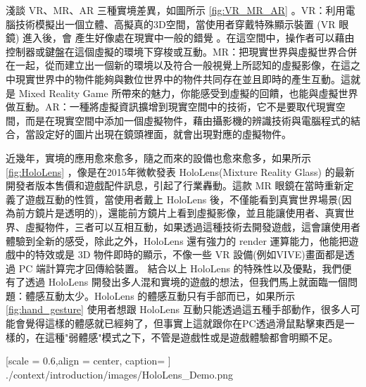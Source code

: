 
淺談 VR、MR、AR 三種實境差異，如圖所示 \ref{fig:VR_MR_AR} 。VR：利用電腦技術模擬出一個立體、高擬真的3D空間，當使用者穿戴特殊顯示裝置 (VR 眼鏡) 進入後，會 產生好像處在現實中一般的錯覺 。在這空間中，操作者可以藉由控制器或鍵盤在這個虛擬的環境下穿梭或互動。MR：把現實世界與虛擬世界合併在一起，從而建立出一個新的環境以及符合一般視覺上所認知的虛擬影像，在這之中現實世界中的物件能夠與數位世界中的物件共同存在並且即時的產生互動。這就是 Mixed Reality Game 所帶來的魅力，你能感受到虛擬的回饋，也能與虛擬世界做互動。AR：一種將虛擬資訊擴增到現實空間中的技術，它不是要取代現實空間，而是在現實空間中添加一個虛擬物件，藉由攝影機的辨識技術與電腦程式的結合，當設定好的圖片出現在鏡頭裡面，就會出現對應的虛擬物件。


近幾年，實境的應用愈來愈多，隨之而來的設備也愈來愈多，如果所示 \ref{fig:HoloLens} ，像是在2015年微軟發表 HoloLens(Mixture Reality Glass) 的最新開發者版本售價和遊戲配件訊息，引起了行業轟動。這款 MR 眼鏡在當時重新定義了遊戲互動的性質，當使用者戴上 HoloLens 後，不僅能看到真實世界場景(因為前方鏡片是透明的)，還能前方鏡片上看到虛擬影像，並且能讓使用者、真實世界、虛擬物件，三者可以互相互動，如果透過這種技術去開發遊戲，這會讓使用者體驗到全新的感受，除此之外，HoloLens 還有強力的 render 運算能力，他能把遊戲中的特效或是 3D 物件即時的顯示，不像一些 VR 設備(例如VIVE)畫面都是透過 PC 端計算完才回傳給裝置。
結合以上 HoloLens 的特殊性以及優點，我們便有了透過 HoloLens 開發出多人混和實境的遊戲的想法，但我們馬上就面臨一個問題：體感互動太少。HoloLens 的體感互動只有手部而已，如果所示 \ref{fig:hand_gesture} 使用者想跟 HoloLens 互動只能透過這五種手部動作，很多人可能會覺得這樣的體感就已經夠了，但事實上這就跟你在PC透過滑鼠點擊東西是一樣的，在這種"弱體感"模式之下，不管是遊戲性或是遊戲體驗都會明顯不足。

%
{   
	[scale = 0.6,align = center, caption={ } ]
	{./context/introduction/images/HoloLens_Demo.png}
}%


